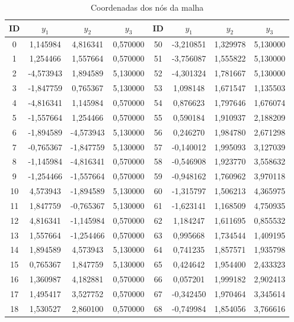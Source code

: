 \begin{apendicesenv}
\begin{table}[H] 
	\ABNTEXfontereduzida
	\caption{Coordenadas dos nós da malha}
	\centering
	\scriptsize
	\begin{tabular}{c c c c c c c c}
		\toprule
		 \centering \textbf{ID} & $y_1$ & $y_2$ & $y_3$ & \textbf{ID} & $y_1$ & $y_2$ & $y_3$ \\
		\midrule
0 & 1,145984 & 4,816341 & 0,570000 & 50 & -3,210851 & 1,329978 & 5,130000 \\
1 & 1,254466 & 1,557664 & 0,570000 & 51 & -3,756087 & 1,555822 & 5,130000 \\
2 & -4,573943 & 1,894589 & 5,130000 & 52 & -4,301324 & 1,781667 & 5,130000 \\
3 & -1,847759 & 0,765367 & 5,130000 & 53 & 1,098148 & 1,671547 & 1,135503 \\
4 & -4,816341 & 1,145984 & 0,570000 & 54 & 0,876623 & 1,797646 & 1,676074 \\
5 & -1,557664 & 1,254466 & 0,570000 & 55 & 0,590184 & 1,910937 & 2,188209 \\
6 & -1,894589 & -4,573943 & 5,130000 & 56 & 0,246270 & 1,984780 & 2,671298 \\
7 & -0,765367 & -1,847759 & 5,130000 & 57 & -0,140012 & 1,995093 & 3,127039 \\
8 & -1,145984 & -4,816341 & 0,570000 & 58 & -0,546908 & 1,923770 & 3,558632 \\
9 & -1,254466 & -1,557664 & 0,570000 & 59 & -0,948162 & 1,760962 & 3,970118 \\
10 & 4,573943 & -1,894589 & 5,130000 & 60 & -1,315797 & 1,506213 & 4,365975 \\
11 & 1,847759 & -0,765367 & 5,130000 & 61 & -1,623141 & 1,168509 & 4,750935 \\
12 & 4,816341 & -1,145984 & 0,570000 & 62 & 1,184247 & 1,611695 & 0,855532 \\
13 & 1,557664 & -1,254466 & 0,570000 & 63 & 0,995668 & 1,734544 & 1,409195 \\
14 & 1,894589 & 4,573943 & 5,130000 & 64 & 0,741235 & 1,857571 & 1,935798 \\
15 & 0,765367 & 1,847759 & 5,130000 & 65 & 0,424642 & 1,954400 & 2,433323 \\
16 & 1,360987 & 4,182881 & 0,570000 & 66 & 0,057201 & 1,999182 & 2,902413 \\
17 & 1,495417 & 3,527752 & 0,570000 & 67 & -0,342450 & 1,970464 & 3,345614 \\
18 & 1,530527 & 2,860100 & 0,570000 & 68 & -0,749984 & 1,854056 & 3,766616 \\

\end{tabular}
\end{table}
\end{apendicesenv}
